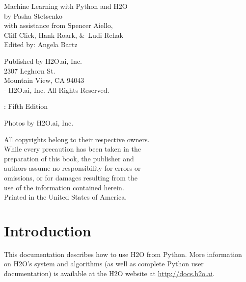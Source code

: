 \newpage
\restoregeometry

\null\vfill %

\thispagestyle{empty}%

{\raggedright 

Machine Learning with Python and H2O\\
  by Pasha Stetsenko \\
  with assistance from Spencer Aiello, \\
  Cliff Click, Hank Roark, \&\ Ludi Rehak \\
Edited by: Angela Bartz
\bigskip

Published by H2O.ai, Inc. \\
2307 Leghorn St. \\
Mountain View, CA 94043\\
\bigskip
{}-\the\year \hspace{1pt} H2O.ai, Inc. All Rights Reserved. 
\bigskip

\monthname \hspace{1pt}  \the\year: Fifth Edition
\bigskip

Photos by \textcopyright H2O.ai, Inc.
\bigskip

All copyrights belong to their respective owners.\\
While every precaution has been taken in the\\
preparation of this book, the publisher and\\
authors assume no responsibility for errors or\\
omissions, or for damages resulting from the\\
use of the information contained herein.\\
\bigskip
Printed in the United States of America. 
}


\newpage
\thispagestyle{empty}%

\tableofcontents
\thispagestyle{empty}%

\newpage

\section{Introduction}

This documentation describes how to use H2O from Python. More information on H2O's system and algorithms
(as well as complete Python user documentation) is available at the H2O website at {\url{http://docs.h2o.ai}}.

